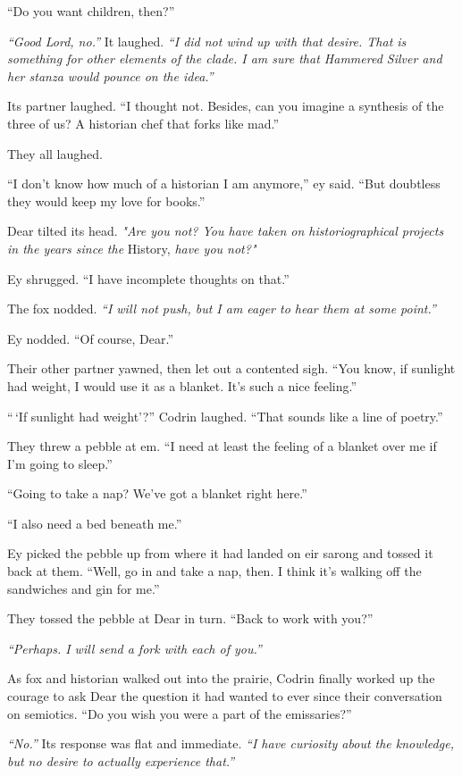 ``Do you want children, then?''

\emph{``Good Lord, no.''} It laughed. \emph{``I did not wind up with that desire. That is something for other elements of the clade. I am sure that Hammered Silver and her stanza would pounce on the idea.''}

Its partner laughed. ``I thought not. Besides, can you imagine a synthesis of the three of us? A historian chef that forks like mad.''

They all laughed.

``I don't know how much of a historian I am anymore,'' ey said. ``But doubtless they would keep my love for books.''

Dear tilted its head. \emph{"Are you not? You have taken on historiographical projects in the years since the} History, \emph{have you not?"}

Ey shrugged. ``I have incomplete thoughts on that.''

The fox nodded. \emph{``I will not push, but I am eager to hear them at some point.''}

Ey nodded. ``Of course, Dear.''

Their other partner yawned, then let out a contented sigh. ``You know, if sunlight had weight, I would use it as a blanket. It's such a nice feeling.''

``\,`If sunlight had weight'?'' Codrin laughed. ``That sounds like a line of poetry.''

They threw a pebble at em. ``I need at least the feeling of a blanket over me if I'm going to sleep.''

``Going to take a nap? We've got a blanket right here.''

``I also need a bed beneath me.''

Ey picked the pebble up from where it had landed on eir sarong and tossed it back at them. ``Well, go in and take a nap, then. I think it's walking off the sandwiches and gin for me.''

They tossed the pebble at Dear in turn. ``Back to work with you?''

\emph{``Perhaps. I will send a fork with each of you.''}

As fox and historian walked out into the prairie, Codrin finally worked up the courage to ask Dear the question it had wanted to ever since their conversation on semiotics. ``Do you wish you were a part of the emissaries?''

\emph{``No.''} Its response was flat and immediate. \emph{``I have curiosity about the knowledge, but no desire to actually experience that.''}

